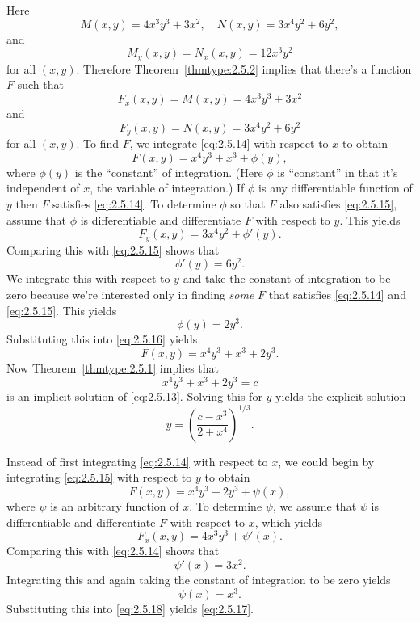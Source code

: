 \begin{examplesolution}
 Here
\[
  M(x,y)=4x^{3}y^{3}+3x^{2},\quad N(x,y)=3x^{4}y^{2}+6y^{2},
\]
and
\[
  M_{y}(x,y)=N_{x}(x,y)=12x^{3}y^{2}
\]
for all $(x,y)$. Therefore Theorem~\ref{thmtype:2.5.2} implies that there's a function $F$ such that
\begin{equation}
  \label{eq:2.5.14}F_{x}(x,y)=M(x,y)=4x^{3}y^{3}+3x^{2}
\end{equation}
and
\begin{equation}
  \label{eq:2.5.15}F_{y}(x,y)=N(x,y)=3x^{4}y^{2}+6y^{2}
\end{equation}
for all $(x,y)$. To find $F$, we integrate \eqref{eq:2.5.14} with respect to $x$ to obtain
\begin{equation}
  \label{eq:2.5.16}F(x,y)=x^{4}y^{3}+x^{3}+\phi(y),
\end{equation}
where $\phi(y)$ is the ``constant'' of integration. (Here $\phi$ is ``constant'' in that it's
independent of $x$, the variable of integration.) If $\phi$ is any differentiable function of $y$
then $F$ satisfies \eqref{eq:2.5.14}. To determine $\phi$ so that $F$ also satisfies
\eqref{eq:2.5.15}, assume that $\phi$ is differentiable and differentiate $F$ with respect to $y$.
This yields
\[
  F_{y}(x,y)=3x^{4}y^{2}+\phi'(y).
\]
Comparing this with \eqref{eq:2.5.15} shows that
\[
  \phi'(y)=6y^{2}.
\]
We integrate this with respect to $y$ and take the constant of integration to be zero because we're
interested only in finding {\color{blue}\it some} $F$ that satisfies \eqref{eq:2.5.14} and
\eqref{eq:2.5.15}. This yields
\[
  \phi(y)=2y^{3}.
\]
Substituting this into \eqref{eq:2.5.16} yields
\begin{equation}
  \label{eq:2.5.17}F(x,y)=x^{4}y^{3}+x^{3}+2y^{3}.
\end{equation}
Now Theorem~\ref{thmtype:2.5.1} implies that
\[
  x^{4}y^{3}+x^{3}+2y^{3}=c
\]
is an implicit solution of \eqref{eq:2.5.13}. Solving this for $y$ yields the explicit solution
\[
  y=\left(\frac{c-x^{3}}{2+x^{4}}\right)^{1/3}.
\]

 Instead of first integrating \eqref{eq:2.5.14} with respect to $x$, we could
begin by integrating \eqref{eq:2.5.15} with respect to $y$ to obtain
\begin{equation}
  \label{eq:2.5.18}F(x,y)=x^{4}y^{3}+2y^{3}+\psi(x),
\end{equation}
where $\psi$ is an arbitrary function of $x$. To determine $\psi$, we assume that $\psi$ is
differentiable and differentiate $F$ with respect to $x$, which yields
\[
  F_{x}(x,y)=4x^{3}y^{3}+\psi'(x).
\]
Comparing this with \eqref{eq:2.5.14} shows that
\[
  \psi'(x)=3x^{2}.
\]
Integrating this and again taking the constant of integration to be zero yields
\[
  \psi(x)=x^{3}.
\]
Substituting this into \eqref{eq:2.5.18} yields \eqref{eq:2.5.17}.


\end{examplesolution}
